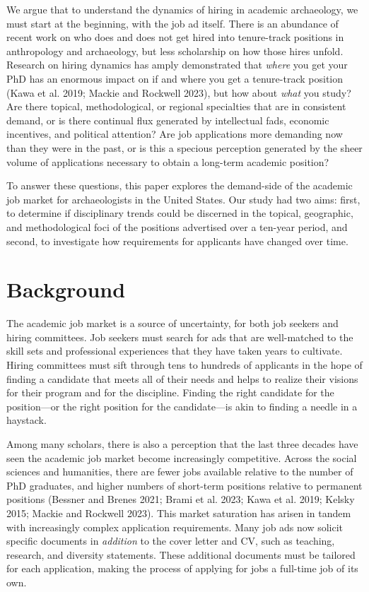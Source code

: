 \documentclass[
  12pt,
]{article}
\begin{document}
We argue that to understand the dynamics of hiring in academic
archaeology, we must start at the beginning, with the job ad itself.
There is an abundance of recent work on who does and does not get hired
into tenure-track positions in anthropology and archaeology, but less
scholarship on how those hires unfold. Research on hiring dynamics has
amply demonstrated that \emph{where} you get your PhD has an enormous
impact on if and where you get a tenure-track position (Kawa et al.
2019; Mackie and Rockwell 2023), but how about \emph{what} you study?
Are there topical, methodological, or regional specialties that are in
consistent demand, or is there continual flux generated by intellectual
fads, economic incentives, and political attention? Are job applications
more demanding now than they were in the past, or is this a specious
perception generated by the sheer volume of applications necessary to
obtain a long-term academic position?

To answer these questions, this paper explores the demand-side of the
academic job market for archaeologists in the United States. Our study
had two aims: first, to determine if disciplinary trends could be
discerned in the topical, geographic, and methodological foci of the
positions advertised over a ten-year period, and second, to investigate
how requirements for applicants have changed over time.

\section{Background}\label{background}

The academic job market is a source of uncertainty, for both job seekers
and hiring committees. Job seekers must search for ads that are
well-matched to the skill sets and professional experiences that they
have taken years to cultivate. Hiring committees must sift through tens
to hundreds of applicants in the hope of finding a candidate that meets
all of their needs and helps to realize their visions for their program
and for the discipline. Finding the right candidate for the
position---or the right position for the candidate---is akin to finding
a needle in a haystack.

Among many scholars, there is also a perception that the last three
decades have seen the academic job market become increasingly
competitive. Across the social sciences and humanities, there are fewer
jobs available relative to the number of PhD graduates, and higher
numbers of short-term positions relative to permanent positions (Bessner
and Brenes 2021; Brami et al. 2023; Kawa et al. 2019; Kelsky 2015;
Mackie and Rockwell 2023). This market saturation has arisen in tandem
with increasingly complex application requirements. Many job ads now
solicit specific documents in \emph{addition} to the cover letter and
CV, such as teaching, research, and diversity statements. These
additional documents must be tailored for each application, making the
process of applying for jobs a full-time job of its own.
\end{document}
